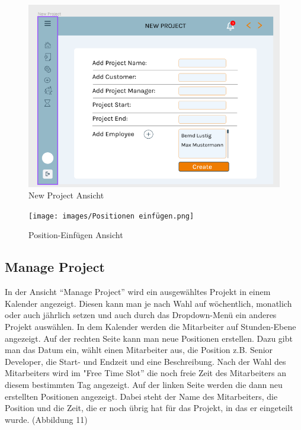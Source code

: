 \documentclass{article}
\begin{document}
\newpage
         \begin{figure}[h]
            \includegraphics[height= 0.5\textwidth,width= \textwidth]{images/New Project.png}
            \caption{New Project Ansicht}
            \label{fig:beispiel}
        \end{figure}

        \begin{figure}[h]
            \texttt{[image: images/Positionen einfügen.png]}
            \caption{Position-Einfügen Ansicht}
            \label{fig:beispiel}
        \end{figure}
      
        \subsection{Manage Project}
        In  der Ansicht “Manage Project” wird ein ausgewähltes Projekt in einem Kalender angezeigt. Diesen kann man je nach Wahl auf wöchentlich, monatlich oder auch jährlich setzen und auch durch das Dropdown-Menü ein anderes Projekt auswählen. In dem Kalender werden die Mitarbeiter auf Stunden-Ebene angezeigt. Auf der rechten Seite kann man neue Positionen erstellen. Dazu gibt man das Datum ein, wählt einen Mitarbeiter aus, die Position z.B. Senior Developer, die Start- und Endzeit und eine Beschreibung. Nach der Wahl des Mitarbeiters wird im "Free Time Slot” die noch freie Zeit des Mitarbeiters an diesem bestimmten Tag angezeigt. Auf der linken Seite werden die dann neu erstellten Positionen angezeigt. Dabei steht der Name des Mitarbeiters, die Position und die Zeit, die er noch übrig hat für das Projekt, in das er eingeteilt wurde. (Abbildung 11)
\end{document}

